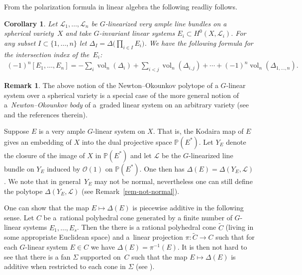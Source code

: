\documentclass[pdftex]{sigma}
\def \p{\mathbb{P}}
\def \vol{\operatorname{vol}}
\numberwithin{equation}{section}
\newtheorem{Cor}[Th]{Corollary}
\theoremstyle{definition}
\newtheorem{Rem}[Th]{Remark}
\begin{document}
From the polarization formula in linear algebra the following readliy follows.
\begin{Cor} \label{prop-int-number-several-divisors}
Let ${\mathcal L}_1, \ldots, {\mathcal L}_n$ be $G$-linearized very ample line bundles on a spherical variety~$X$ and take $G$-invariant linear systems $E_i \subset H^0(X, {\mathcal L}_i)$. For any subset $I \subset \{1, \ldots, n\}$ let $\Delta_I = \Delta\big(\prod_{i \in I} E_i\big)$. We have the following formula for the intersection index of the~$E_i$:
\begin{gather*}
(-1)^n [E_1, \ldots, E_n] = - \sum_{i} \vol_n(\Delta_i) + \sum_{i < j} \vol_n(\Delta_{i,j}) + \cdots
+ (-1)^n \vol_n(\Delta_{1, \ldots, n}).
\end{gather*}
\end{Cor}

\begin{Rem} \label{rem-NO-body}The above notion of the Newton--Okounkov polytope of a $G$-linear system over a spherical variety is a special case of the more general notion of a~{\it Newton--Okounkov body} of a~graded linear system on an arbitrary variety (see \cite{KKh-Annals, LM} and the references therein).
\end{Rem}

Suppose $E$ is a very ample $G$-linear system on $X$. That is, the Kodaira map of $E$ gives an embedding of $X$ into the dual projective space $\p(E^*)$. Let $Y_E$ denote the closure of the image of $X$ in $\p(E^*)$ and let ${\mathcal L}$ be the $G$-linearized line bundle on $Y_E$ induced by $\mathcal{O}(1)$ on $\p(E^*)$. One then has $\Delta(E) = \Delta(Y_E, {\mathcal L})$. We note that in general~$Y_E$ may not be normal, nevertheless one can still define the polytope $\Delta(Y_E, {\mathcal L})$ (see Remark~\ref{rem-not-normal}).

One can show that the map $E \mapsto \Delta(E)$ is piecewise additive in the following sense. Let $C$ be a~rational polyhedral cone generated by a finite number of $G$-linear systems $E_1, \ldots, E_s$. Then the there is a rational polyhedral cone $\tilde{C}$ (living in some appropriate Euclidean space) and a~linear projection $\pi\colon \tilde{C} \to C$ such that for each $G$-linear system $E \in C$ we have $\Delta(E) = \pi^{-1}(E)$. It is then not hard to see that there is a fan $\Sigma$ supported on~$C$ such that the map
$E \mapsto \Delta(E)$ is additive when restricted to each cone in $\Sigma$ (see \cite[Proposition~1.4]{KV}).
\end{document}
